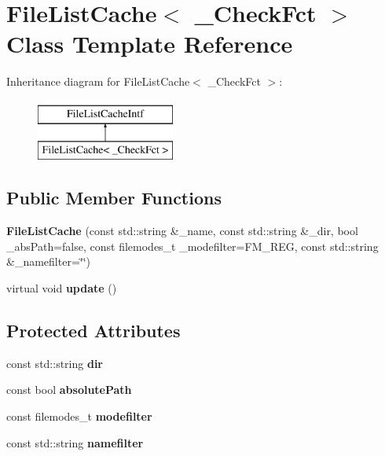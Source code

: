 \hypertarget{class_file_list_cache}{
\section{FileListCache$<$ \_\-CheckFct $>$ Class Template Reference}
\label{class_file_list_cache}
}
Inheritance diagram for FileListCache$<$ \_\-CheckFct $>$:\begin{figure}[H]
\begin{center}
\leavevmode
\includegraphics[height=2cm]{class_file_list_cache}
\end{center}
\end{figure}
\subsection*{Public Member Functions}
\begin{DoxyCompactItemize}
\item 
\hypertarget{class_file_list_cache_ac000fe7965641c6e97033e58b6294067}{
{\bfseries FileListCache} (const std::string \&\_\-name, const std::string \&\_\-dir, bool \_\-absPath=false, const filemodes\_\-t \_\-modefilter=FM\_\-REG, const std::string \&\_\-namefilter=\char`\"{}\char`\"{})}
\label{class_file_list_cache_ac000fe7965641c6e97033e58b6294067}

\item 
\hypertarget{class_file_list_cache_a95664fe4def29f32b6fd42759d711d6b}{
virtual void {\bfseries update} ()}
\label{class_file_list_cache_a95664fe4def29f32b6fd42759d711d6b}

\end{DoxyCompactItemize}
\subsection*{Protected Attributes}
\begin{DoxyCompactItemize}
\item 
\hypertarget{class_file_list_cache_acc87afcd81d1f089880ec3da4e1d1b04}{
const std::string {\bfseries dir}}
\label{class_file_list_cache_acc87afcd81d1f089880ec3da4e1d1b04}

\item 
\hypertarget{class_file_list_cache_a5b3d1b852ce9cf504657895a746b8dcc}{
const bool {\bfseries absolutePath}}
\label{class_file_list_cache_a5b3d1b852ce9cf504657895a746b8dcc}

\item 
\hypertarget{class_file_list_cache_a0398dcf1f2bc3c877b988f5af1868406}{
const filemodes\_\-t {\bfseries modefilter}}
\label{class_file_list_cache_a0398dcf1f2bc3c877b988f5af1868406}

\item 
\hypertarget{class_file_list_cache_ac17dd2cba42b70635c82702b351ef4c5}{
const std::string {\bfseries namefilter}}
\label{class_file_list_cache_ac17dd2cba42b70635c82702b351ef4c5}

\end{DoxyCompactItemize}
